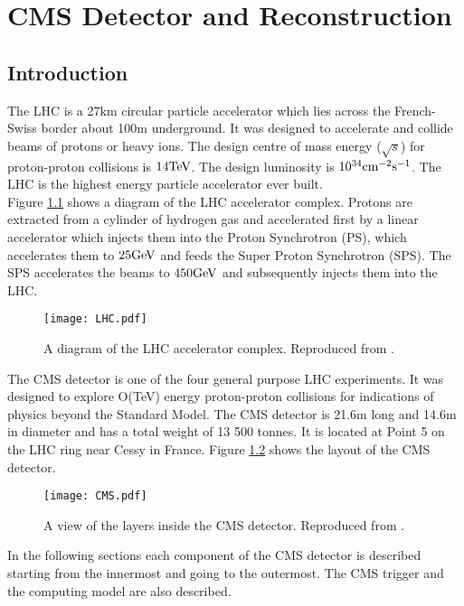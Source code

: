 \chapter{CMS Detector and Reconstruction}

\section{Introduction}

The LHC is a 27km circular particle accelerator which lies across the
French-Swiss border about 100m underground. It was designed to accelerate and 
collide beams of protons or heavy ions. The design centre of mass energy
($\sqrt{s}$) for proton-proton collisions is $14\mbox{TeV}$. The design luminosity is
$10^{34}\mbox{cm}^{-2}\mbox{s}^{-1}$. The LHC is the highest energy particle accelerator ever
built. \\

Figure \ref{fig:LHC} shows a diagram of the LHC accelerator complex. Protons are
extracted from a cylinder of hydrogen gas and accelerated first by a linear
accelerator which injects them into the Proton Synchrotron (PS), which 
accelerates them to $25\mbox{GeV}$ and feeds the Super Proton Synchrotron (SPS). The
SPS accelerates the beams to $450\mbox{GeV}$ and subsequently injects them into the
LHC. \\

\begin{figure}
\texttt{[image: LHC.pdf]}
\caption{A diagram of the LHC accelerator complex. Reproduced from
\cite{physics_tdr_1}.}
\label{fig:LHC}
\end{figure}

The CMS detector is one of the four general purpose LHC experiments. It was 
designed to explore O(TeV) energy proton-proton collisions for indications of 
physics beyond the Standard Model. The CMS detector is 21.6m long and 14.6m in 
diameter and has a total weight of 13 500 tonnes. It is located at Point 5 on 
the LHC ring near Cessy in France. Figure \ref{fig:CMS} shows the layout of the 
CMS detector. \\

\begin{figure}
\texttt{[image: CMS.pdf]}
\caption{A view of the layers inside the CMS detector. Reproduced from
\cite{physics_tdr_1}.}
\label{fig:CMS}
\end{figure}

In the following sections each component of the CMS detector is described 
starting from the innermost and going to the outermost. The CMS trigger and the
computing model are also described. 

